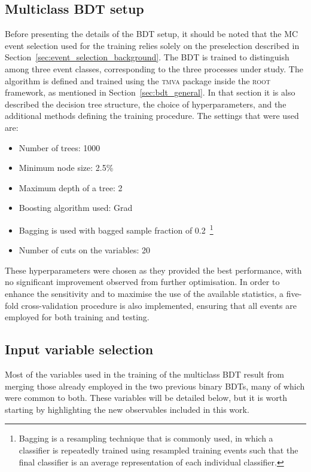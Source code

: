 \subsection{Multiclass BDT setup}
\label{setup_bdt}
Before presenting the details of the BDT setup, it should be noted that the MC event selection used for the training relies solely on the preselection described in Section~\ref{sec:event_selection_background}. The BDT is trained to distinguish among three event classes, corresponding to the three processes under study. The algorithm is defined and trained using the \textsc{tmva} package inside the \textsc{root} framework, as mentioned in Section~\ref{sec:bdt_general}. In that section it is also described the decision tree structure, the choice of hyperparameters, and the additional methods defining the training procedure. The settings that were used are:
\begin{itemize}
    \small
    \item Number of trees: 1000
    \item Minimum node size: 2.5\%
    \item Maximum depth of a tree: 2
    \item Boosting algorithm used: Grad
    \item Bagging is used with bagged sample fraction of 0.2~\footnote{Bagging is a resampling technique that is commonly used, in which a classifier is repeatedly trained using resampled training
    events such that the final classifier is an average representation of each individual classifier.}
    \item Number of cuts on the variables: 20
\end{itemize}
These hyperparameters were chosen as they provided the best performance, with no significant improvement observed from further optimisation. In order to enhance the sensitivity and to maximise the use of the available statistics, a five-fold cross-validation procedure is also implemented, ensuring that all events are employed for both training and testing.

\subsection{Input variable selection}

Most of the variables used in the training of the multiclass BDT result from merging those already employed in the two previous binary BDTs, many of which were common to both. These variables will be detailed below, but it is worth starting by highlighting the new observables included in this work.

